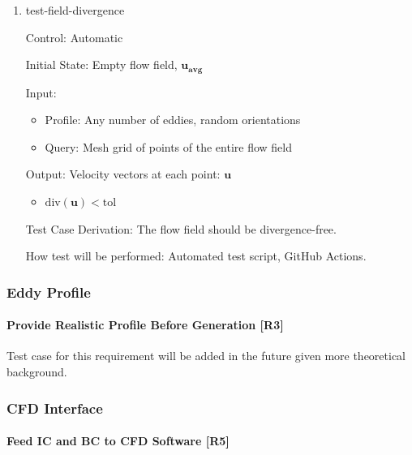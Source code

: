 \documentclass[12pt, titlepage]{article}
\begin{document}
\begin{enumerate}

  \item{test-field-divergence\\}

  Control: Automatic
            
  Initial State: Empty flow field, $\mathbf{u_{avg}}$
            
  Input:
  \begin{itemize}
    \item Profile: Any number of eddies, random orientations
    \item Query: Mesh grid of points of the entire flow field
  \end{itemize}
  Output: Velocity vectors at each point: $\mathbf{u}$
  \begin{itemize}
    \item $\text{div}(\mathbf{u}) < \text{tol}$
  \end{itemize}

  Test Case Derivation: The flow field should be divergence-free.

  How test will be performed: Automated test script, GitHub Actions.

\end{enumerate}

\subsubsection{Eddy Profile} \label{EddyProfile}
\paragraph{Provide Realistic Profile Before Generation [R3]\\}
Test case for this requirement will be added in the future given more theoretical background.

\subsubsection{CFD Interface} \label{CFDInterface}
\paragraph{Feed IC and BC to CFD Software [R5]\\}
\end{document}
